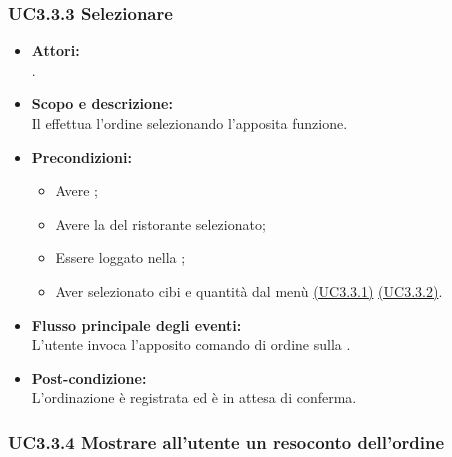 \subsubsection{UC3.3.3 Selezionare } \label{UC3.3.3}

\begin{itemize}
	\item \textbf{Attori:}
	\\.
	\item \textbf{Scopo e descrizione:} 
	\\Il {} effettua l'ordine selezionando l'apposita funzione.
	\item \textbf{Precondizioni:}
	\begin{itemize}
		\item Avere ;
		\item Avere la  del ristorante selezionato;
		\item Essere loggato nella ;
		\item Aver selezionato cibi e quantità dal menù \hyperref[UC3.3.1]{(UC3.3.1)} \hyperref[UC3.3.2]{(UC3.3.2)}.
	\end{itemize}
	\item \textbf{Flusso principale degli eventi:}
	\\L'utente invoca l'apposito comando di ordine sulla .
	\item \textbf{Post-condizione:}
	\\L'ordinazione è registrata ed è in attesa di conferma.
\end{itemize}

\subsubsection{UC3.3.4 Mostrare all'utente un resoconto dell'ordine} \label{UC3.3.4}

